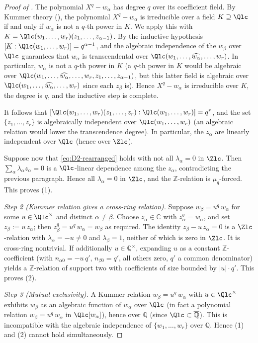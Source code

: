 \begin{proof}[Proof of ]
The polynomial $X^q - w_\alpha$ has degree $q$ over its coefficient
field. By Kummer theory (\cite[Ch.~VI, Thm.~9.1]{lang-algebra}), the
polynomial $X^q - w_\alpha$ is irreducible over a field $K \supseteq
\Qlc$ if and only if $w_\alpha$ is not a $q$-th power in $K$. We
apply this with $K = \Qlc(w_1, \dots, w_r)(z_1, \dots, z_{\alpha - 1})$.
By the inductive hypothesis $[K : \Qlc(w_1, \dots, w_r)] = q^{\alpha - 1}$,
and the algebraic independence of the $w_\beta$ over $\Qlc$ guarantees
that $w_\alpha$ is transcendental over $\Qlc(w_1, \dots,
\widehat{w_\alpha}, \dots, w_r)$. In particular, $w_\alpha$ is not a
$q$-th power in $K$ (a $q$-th power in $K$ would be algebraic over
$\Qlc(w_1, \dots, \widehat{w_\alpha}, \dots, w_r, z_1, \dots,
z_{\alpha - 1})$, but this latter field is algebraic over
$\Qlc(w_1, \dots, \widehat{w_\alpha}, \dots, w_r)$ since each
$z_\beta$ is). Hence $X^q - w_\alpha$ is irreducible over $K$, the
degree is $q$, and the inductive step is complete.

It follows that
$[\Qlc(w_1, \dots, w_r)(z_1, \dots, z_r) :
\Qlc(w_1, \dots, w_r)] = q^r$, and the set $\{z_1, \dots, z_r\}$ is
algebraically independent over $\Qlc(w_1, \dots, w_r)$ (an algebraic
relation would lower the transcendence degree). In particular, the
$z_\alpha$ are linearly independent over $\Qlc$ (hence over $\Zlc$).

Suppose now that \eqref{eq:D2-rearranged} holds with not all
$\lambda_\alpha = 0$ in $\Zlc$. Then $\sum_\alpha \lambda_\alpha z_\alpha
= 0$ is a $\Qlc$-linear dependence among the $z_\alpha$, contradicting
the previous paragraph. Hence all $\lambda_\alpha = 0$ in $\Zlc$, and
the $\mathbb{Z}$-relation is $\mu_q$-forced. This proves (1).

\smallskip
\textit{Step 2 (Kummer relation gives a cross-ring relation).}
Suppose $w_\beta = u^q\, w_\alpha$ for some $u \in \Qlc^\times$ and
distinct $\alpha \ne \beta$. Choose $z_\alpha \in \mathbb{C}$ with
$z_\alpha^q = w_\alpha$, and set $z_\beta := u\, z_\alpha$; then
$z_\beta^q = u^q\, w_\alpha = w_\beta$ as required. The identity
$z_\beta - u\, z_\alpha = 0$ is a $\Zlc$-relation with
$\lambda_\alpha = -u \ne 0$ and $\lambda_\beta = 1$, neither of
which is zero in $\Zlc$. It is cross-ring nontrivial. If additionally
$u \in \mathbb{Q}^\times$, expanding $u$ as a constant
$\mathbb{Z}$-coefficient (with $n_{\alpha 0} = -u\, q'$, $n_{\beta 0} =
q'$, all others zero, $q'$ a common denominator) yields a
$\mathbb{Z}$-relation of support two with coefficients of size
bounded by $|u| \cdot q'$. This proves (2).

\smallskip
\textit{Step 3 (Mutual exclusivity).}
A Kummer relation $w_\beta = u^q\, w_\alpha$ with $u \in \Qlc^\times$
exhibits $w_\beta$ as an algebraic function of $w_\alpha$ over $\Qlc$
(in fact a polynomial relation $w_\beta = u^q\, w_\alpha$ in
$\Qlc[w_\alpha]$), hence over $\mathbb{Q}$ (since $\Qlc \subset
\overline{\mathbb{Q}}$). This is incompatible with the algebraic
independence of $\{w_1, \dots, w_r\}$ over $\mathbb{Q}$. Hence (1)
and (2) cannot hold simultaneously.
\end{proof}

